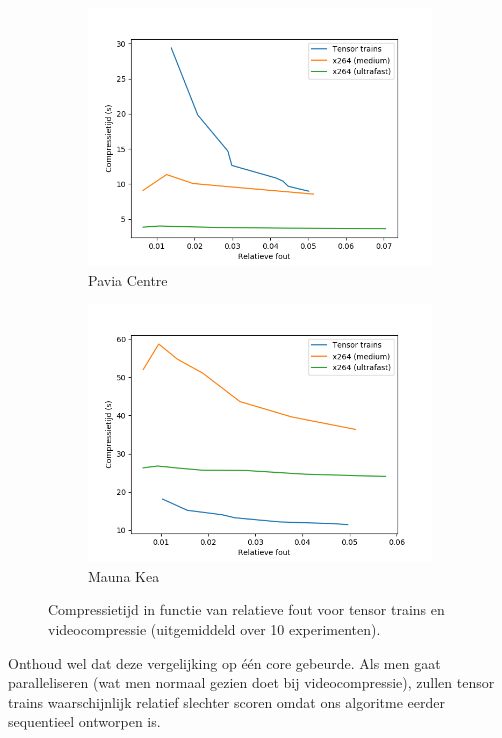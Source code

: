 \begin{figure}[H]
\begin{subfigure}{0.48\textwidth}
  \includegraphics[width=\linewidth]{images/general_comparison_times_Pavia_Centre.png}
  \caption{Pavia Centre}
\end{subfigure}
\begin{subfigure}{0.48\textwidth}
  \centering
  \includegraphics[width=\linewidth]{images/general_comparison_times_Mauna_Kea.png}
  \caption{Mauna Kea}
\end{subfigure}
\caption{Compressietijd in functie van relatieve fout voor tensor trains en videocompressie (uitgemiddeld over 10 experimenten).}
\label{fig:general-comparison-times}
\end{figure}

Onthoud wel dat deze vergelijking op \'e\'en core gebeurde. Als men gaat paralleliseren (wat men normaal gezien doet bij videocompressie), zullen tensor trains waarschijnlijk relatief slechter scoren omdat ons algoritme eerder sequentieel ontworpen is.\\

